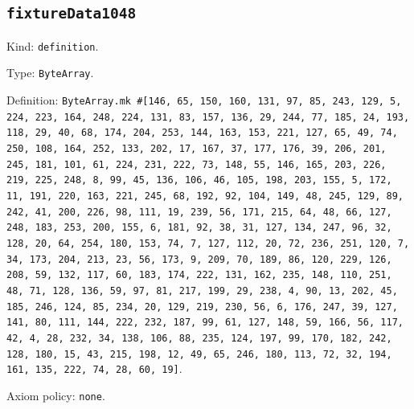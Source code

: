 \documentclass[11pt]{article}
\begin{document}
\subsection*{\texttt{fixtureData1048}}
\noindent Kind: \texttt{definition}.\par
\noindent Type: \texttt{ByteArray}.\par
\noindent Definition: \texttt{ByteArray.mk \#[146, 65, 150, 160, 131, 97, 85, 243, 129, 5, 224, 223, 164, 248, 224, 131, 83, 157, 136, 29, 244, 77, 185, 24, 193, 118, 29, 40, 68, 174, 204, 253, 144, 163, 153, 221, 127, 65, 49, 74, 250, 108, 164, 252, 133, 202, 17, 167, 37, 177, 176, 39, 206, 201, 245, 181, 101, 61, 224, 231, 222, 73, 148, 55, 146, 165, 203, 226, 219, 225, 248, 8, 99, 45, 136, 106, 46, 105, 198, 203, 155, 5, 172, 11, 191, 220, 163, 221, 245, 68, 192, 92, 104, 149, 48, 245, 129, 89, 242, 41, 200, 226, 98, 111, 19, 239, 56, 171, 215, 64, 48, 66, 127, 248, 183, 253, 200, 155, 6, 181, 92, 38, 31, 127, 134, 247, 96, 32, 128, 20, 64, 254, 180, 153, 74, 7, 127, 112, 20, 72, 236, 251, 120, 7, 34, 173, 204, 213, 23, 56, 173, 9, 209, 70, 189, 86, 120, 229, 126, 208, 59, 132, 117, 60, 183, 174, 222, 131, 162, 235, 148, 110, 251, 48, 71, 128, 136, 59, 97, 81, 217, 199, 29, 238, 4, 90, 13, 202, 45, 185, 246, 124, 85, 234, 20, 129, 219, 230, 56, 6, 176, 247, 39, 127, 141, 80, 111, 144, 222, 232, 187, 99, 61, 127, 148, 59, 166, 56, 117, 42, 4, 28, 232, 34, 138, 106, 88, 235, 124, 197, 99, 170, 182, 242, 128, 180, 15, 43, 215, 198, 12, 49, 65, 246, 180, 113, 72, 32, 194, 161, 135, 222, 74, 28, 60, 19]}.\par
\noindent Axiom policy: \texttt{none}.\par
\end{document}
